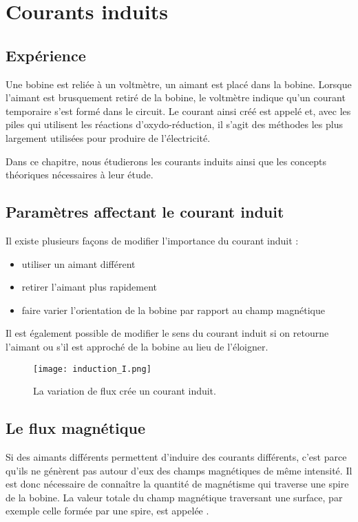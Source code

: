 \chapter{Courants induits}
\section{Expérience}
Une bobine est reliée à un voltmètre, un aimant est placé dans la bobine. Lorsque l'aimant est brusquement retiré de la bobine, le voltmètre indique qu'un courant temporaire s'est formé dans le circuit. Le courant ainsi créé est appelé  et, avec les piles qui utilisent les réactions d'oxydo-réduction, il s'agit des méthodes les plus largement utilisées pour produire de l'électricité.

Dans ce chapitre, nous étudierons les courants induits ainsi que les concepts théoriques nécessaires à leur étude.

\section{Paramètres affectant le courant induit}
Il existe plusieurs façons de modifier l'importance du courant induit :
\begin{itemize}[label=\textbullet]
    \item utiliser un aimant différent
    \item retirer l'aimant plus rapidement
    \item faire varier l'orientation de la bobine par rapport au champ magnétique
\end{itemize}

Il est également possible de modifier le sens du courant induit si on retourne l'aimant ou s'il est approché de la bobine au lieu de l'éloigner.
\begin{figure}[h]
    \centering
    \texttt{[image: induction\_I.png]}
    \caption{La variation de flux crée un courant induit.}
    \label{induction_I}
\end{figure}

\section{Le flux magnétique}
Si des aimants différents permettent d'induire des courants différents, c'est parce qu'ils ne génèrent pas autour d'eux des champs magnétiques de même intensité. Il est donc nécessaire de connaître la quantité de magnétisme qui traverse une spire de la bobine.
La valeur totale du champ magnétique traversant une surface, par exemple celle formée par une spire, est appelée .


